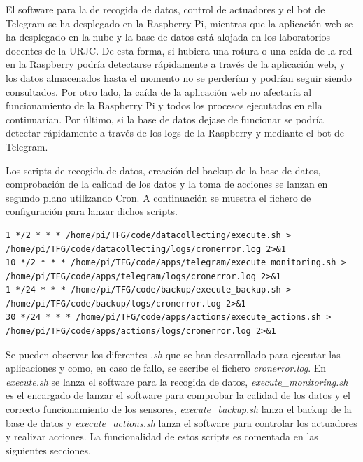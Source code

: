 \documentclass[a4paper, 12pt, oneside]{book}
\begin{document}
El software para la de recogida de datos, control de actuadores y el bot de Telegram se ha desplegado en la Raspberry Pi, mientras que la aplicación web se ha desplegado en la nube y la base de datos está alojada en los laboratorios docentes de la URJC. De esta forma, si hubiera una rotura o una caída de la red en la Raspberry podría detectarse rápidamente a través de la aplicación web, y los datos almacenados hasta el momento no se perderían y podrían seguir siendo consultados. Por otro lado, la caída de la aplicación web no afectaría al funcionamiento de la Raspberry Pi y todos los procesos ejecutados en ella continuarían. Por último, si la base de datos dejase de funcionar se podría detectar rápidamente a través de los logs de la Raspberry y mediante el bot de Telegram.
 
Los scripts de recogida de datos, creación del backup de la base de datos, comprobación de la calidad de los datos y la toma de acciones se lanzan en segundo plano utilizando Cron. A continuación se muestra el fichero de configuración para lanzar dichos scripts.

\begin{lstlisting}
1 */2 * * * /home/pi/TFG/code/datacollecting/execute.sh > /home/pi/TFG/code/datacollecting/logs/cronerror.log 2>&1
10 */2 * * * /home/pi/TFG/code/apps/telegram/execute_monitoring.sh > /home/pi/TFG/code/apps/telegram/logs/cronerror.log 2>&1
1 */24 * * * /home/pi/TFG/code/backup/execute_backup.sh > /home/pi/TFG/code/backup/logs/cronerror.log 2>&1
30 */24 * * * /home/pi/TFG/code/apps/actions/execute_actions.sh > /home/pi/TFG/code/apps/actions/logs/cronerror.log 2>&1
\end{lstlisting}

Se pueden observar los diferentes \textit{.sh} que se han desarrollado para ejecutar las aplicaciones y como, en caso de fallo, se escribe el fichero \textit{cronerror.log}.
En \textit{execute.sh} se lanza el software para la recogida de datos, \textit{execute\_monitoring.sh} es el encargado de lanzar el software para comprobar la calidad de los datos y el correcto funcionamiento de los sensores, \textit{execute\_backup.sh} lanza el backup de la base de datos y \textit{execute\_actions.sh} lanza el software para controlar los actuadores y realizar acciones. La funcionalidad de estos scripts es comentada en las siguientes secciones.



 
\end{document}
